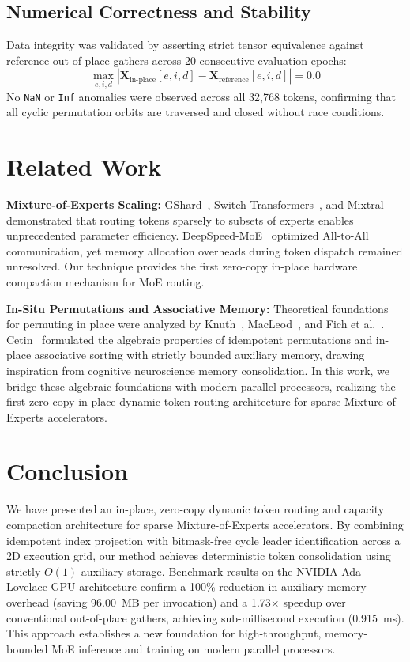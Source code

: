 \documentclass[10pt,twocolumn]{article}
\begin{document}
\subsection{Numerical Correctness and Stability}
Data integrity was validated by asserting strict tensor equivalence against reference out-of-place gathers across 20 consecutive evaluation epochs:
\begin{equation}
    \max_{e,i,d} |\mathbf{X}_{\text{in-place}}[e,i,d] - \mathbf{X}_{\text{reference}}[e,i,d]| = 0.0
\end{equation}
No \texttt{NaN} or \texttt{Inf} anomalies were observed across all 32,768 tokens, confirming that all cyclic permutation orbits are traversed and closed without race conditions.

\section{Related Work}
\label{sec:related}
\textbf{Mixture-of-Experts Scaling:} GShard~\cite{lepikhin2020gshard}, Switch Transformers~\cite{fedus2022switch}, and Mixtral~\cite{jiang2024mixtral} demonstrated that routing tokens sparsely to subsets of experts enables unprecedented parameter efficiency. DeepSpeed-MoE~\cite{rajbhandari2022deepspeed} optimized All-to-All communication, yet memory allocation overheads during token dispatch remained unresolved. Our technique provides the first zero-copy in-place hardware compaction mechanism for MoE routing.

\textbf{In-Situ Permutations and Associative Memory:} Theoretical foundations for permuting in place were analyzed by Knuth~\cite{knuth1998art}, MacLeod~\cite{macleod1970inversion}, and Fich et al.~\cite{fich1995permuting}. Cetin~\cite{cetin2013idempotent, cetin2013insitu, cetin2013inplace, cetin2012improved} formulated the algebraic properties of idempotent permutations and in-place associative sorting with strictly bounded auxiliary memory, drawing inspiration from cognitive neuroscience memory consolidation. In this work, we bridge these algebraic foundations with modern parallel processors, realizing the first zero-copy in-place dynamic token routing architecture for sparse Mixture-of-Experts accelerators.

\section{Conclusion}
\label{sec:conclusion}
We have presented an in-place, zero-copy dynamic token routing and capacity compaction architecture for sparse Mixture-of-Experts accelerators. By combining idempotent index projection with bitmask-free cycle leader identification across a 2D execution grid, our method achieves deterministic token consolidation using strictly $O(1)$ auxiliary storage. Benchmark results on the NVIDIA Ada Lovelace GPU architecture confirm a 100\% reduction in auxiliary memory overhead (saving 96.00~MB per invocation) and a 1.73$\times$ speedup over conventional out-of-place gathers, achieving sub-millisecond execution (0.915~ms). This approach establishes a new foundation for high-throughput, memory-bounded MoE inference and training on modern parallel processors.
\end{document}
